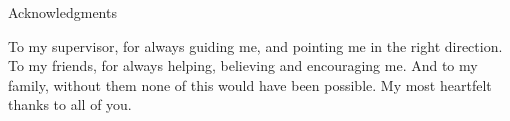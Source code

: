 \thispagestyle{empty}

\vspace*{20mm}

\begin{center}
{ Acknowledgments}
\end{center}

\vspace{10mm}

To my supervisor, for always guiding me, and pointing me in the right direction. To my friends, for always helping, believing and encouraging me. And to my family, without them none of this would have been possible. My most heartfelt thanks to all of you.

\cleardoublepage{}
